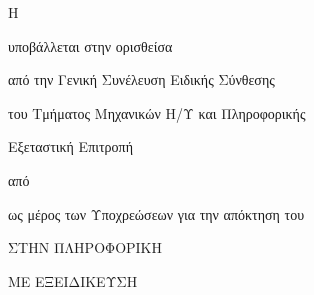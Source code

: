 \makeatletter

{\LARGE \@title}

{\Large
	\vfill \vfill Η \csethesisTypeEl

	\vfill        υποβάλλεται στην ορισθείσα

	\vfill        από την Γενική Συνέλευση Ειδικής Σύνθεσης

	              του Τμήματος Μηχανικών Η/Υ και Πληροφορικής

	              Εξεταστική Επιτροπή

	\vfill        από \@Arthro

	\vfill        {\LARGE \@author}

	\vfill        ως μέρος των Υποχρεώσεων για την απόκτηση του

	\vfill        \csediplwmaEl

	\ifPhD\else
	              ΣΤΗΝ ΠΛΗΡΟΦΟΡΙΚΗ

		          ΜΕ ΕΞΕΙΔΙΚΕΥΣΗ

		          \@Ekseidikseusi
	\fi

	\vfill \vfill \@date
}

\makeatother
\clearpage
